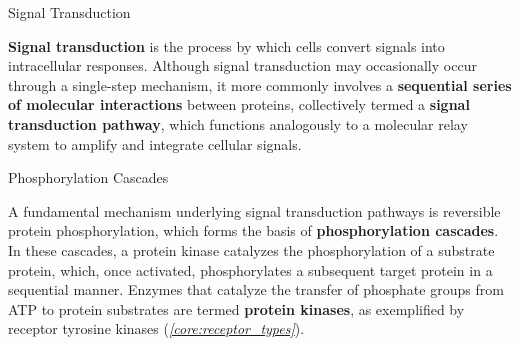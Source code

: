 \documentclass[10pt]{article}
\begin{document}
      \begin{core}{Signal Transduction}

        \textbf{Signal transduction} is the process by which cells convert signals into intracellular responses. Although signal transduction may occasionally occur through a single-step mechanism, it more commonly involves a \textbf{sequential series of molecular interactions} between proteins, collectively termed a \textbf{signal transduction pathway}, which functions analogously to a molecular relay system to amplify and integrate cellular signals.

      \end{core}

      \begin{core}{Phosphorylation Cascades}

        A fundamental mechanism underlying signal transduction pathways is reversible protein phosphorylation, which forms the basis of \textbf{phosphorylation cascades}. In these cascades, a protein kinase catalyzes the phosphorylation of a substrate protein, which, once activated, phosphorylates a subsequent target protein in a sequential manner. Enzymes that catalyze the transfer of phosphate groups from ATP to protein substrates are termed \textbf{protein kinases}, as exemplified by receptor tyrosine kinases (\textit{\autoref{core:receptor_types}}).


      \end{core}
\end{document}
